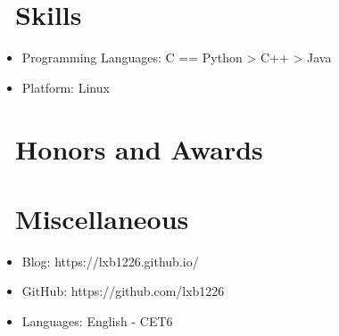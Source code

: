 \documentclass{resume}
\begin{document}

\section{\faCogs\ Skills}
\begin{itemize}[parsep=0.5ex]
    \item Programming Languages: C == Python > C++ > Java
    \item Platform: Linux
\end{itemize}

\section{\faHeartO\ Honors and Awards}


\section{\faInfo\ Miscellaneous}
\begin{itemize}[parsep=0.5ex]
    \item Blog: https://lxb1226.github.io/
    \item GitHub: https://github.com/lxb1226
    \item Languages: English - CET6
\end{itemize}

%
%
\end{document}
